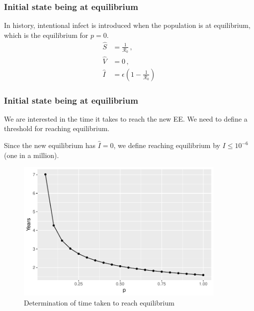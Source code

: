 \documentclass[12pt]{beamer}
\newcommand\dbyd[2]{\frac{\mathrm d{#1}}{\mathrm d{#2}}}
\newcommand{\R}{\mathcal{R}}
\newcommand{\pmV}{p_{V}}
\begin{document}
\begin{frame}
\frametitle{Initial state being at equilibrium}

In history, intentional infect is introduced when the population is at equilibrium, which is the equilibrium for $p=0$.
\pause
\begin{subequations}
\begin{align}
\hat{S} &= \frac{1}{\R_0} \,,\\
\hat{V} &= 0\,,\\
\hat{I} &= \epsilon(1-\frac{1}{\R_0})
\end{align}
\end{subequations}
\end{frame}
\begin{frame}
\frametitle{Initial state being at equilibrium}
We are interested in the time it takes to reach the new EE. We need to define a threshold for reaching equilibrium.
\pause

Since the new equilibrium has $\hat{I}=0$, we define reaching equilibrium by $I\leq 10^{-6}$ (one in a million).
\end{frame}
\begin{frame}
\begin{figure}[h]
  \centering
  \includegraphics[width=0.9\textwidth]{Figures/Time_to_EE_plot.pdf}
  \caption{Determination of time taken to reach equilibrium}
\end{figure}
\end{frame}
\end{document}
